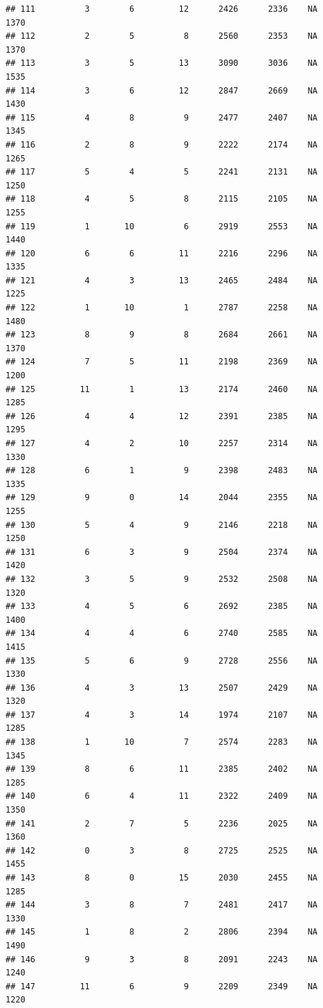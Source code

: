 \documentclass[]{book}
\begin{document}
\begin{verbatim}
## 111          3        6         12      2426      2336    NA    1370
## 112          2        5          8      2560      2353    NA    1370
## 113          3        5         13      3090      3036    NA    1535
## 114          3        6         12      2847      2669    NA    1430
## 115          4        8          9      2477      2407    NA    1345
## 116          2        8          9      2222      2174    NA    1265
## 117          5        4          5      2241      2131    NA    1250
## 118          4        5          8      2115      2105    NA    1255
## 119          1       10          6      2919      2553    NA    1440
## 120          6        6         11      2216      2296    NA    1335
## 121          4        3         13      2465      2484    NA    1225
## 122          1       10          1      2787      2258    NA    1480
## 123          8        9          8      2684      2661    NA    1370
## 124          7        5         11      2198      2369    NA    1200
## 125         11        1         13      2174      2460    NA    1285
## 126          4        4         12      2391      2385    NA    1295
## 127          4        2         10      2257      2314    NA    1330
## 128          6        1          9      2398      2483    NA    1335
## 129          9        0         14      2044      2355    NA    1255
## 130          5        4          9      2146      2218    NA    1250
## 131          6        3          9      2504      2374    NA    1420
## 132          3        5          9      2532      2508    NA    1320
## 133          4        5          6      2692      2385    NA    1400
## 134          4        4          6      2740      2585    NA    1415
## 135          5        6          9      2728      2556    NA    1330
## 136          4        3         13      2507      2429    NA    1320
## 137          4        3         14      1974      2107    NA    1285
## 138          1       10          7      2574      2283    NA    1345
## 139          8        6         11      2385      2402    NA    1285
## 140          6        4         11      2322      2409    NA    1350
## 141          2        7          5      2236      2025    NA    1360
## 142          0        3          8      2725      2525    NA    1455
## 143          8        0         15      2030      2455    NA    1285
## 144          3        8          7      2481      2417    NA    1330
## 145          1        8          2      2806      2394    NA    1490
## 146          9        3          8      2091      2243    NA    1240
## 147         11        6          9      2209      2349    NA    1220

\end{verbatim}
\end{document}
